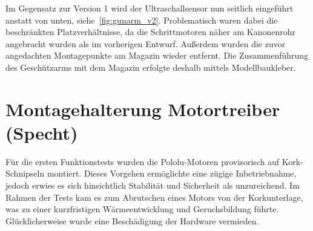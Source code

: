 Im Gegensatz zur Version 1 wird der Ultraschallsensor nun seitlich eingeführt anstatt von unten, siehe~\ref{fig:gunarm_v2}. Problematisch waren dabei die beschränkten Platzverhältnisse, da die Schrittmotoren näher am Kanonenrohr angebracht wurden als im vorherigen Entwurf. Außerdem wurden die zuvor angedachten Montagepunkte am Magazin wieder entfernt. Die Zusammenführung des Geschützarms mit dem Magazin erfolgte deshalb mittels Modellbaukleber.

\section{Montagehalterung Motortreiber (Specht)}

Für die ersten Funktionstests wurden die Pololu-Motoren provisorisch auf Kork-Schnipseln montiert. Dieses Vorgehen ermöglichte eine zügige Inbetriebnahme, jedoch erwies es sich hinsichtlich Stabilität und Sicherheit als unzureichend. Im Rahmen der Tests kam es zum Abrutschen eines Motors von der Korkunterlage, was zu einer kurzfristigen Wärmeentwicklung und Geruchsbildung führte. Glücklicherweise wurde eine Beschädigung der Hardware vermieden.

